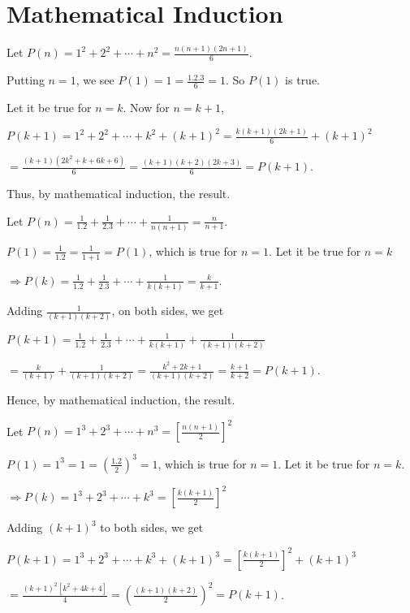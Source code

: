 \chapter{Mathematical Induction}
\startitemize[n, 1*broad]
\item Let $P(n) = 1^2 + 2^2 + \cdots + n^2 = \frac{n(n + 1)(2n + 1)}{6}$.

  Putting $n = 1$, we see $P(1) = 1 = \frac{1.2.3}{6} = 1$. So $P(1)$ is true.

  Let it be true for $n = k$. Now for $n = k + 1$,

  $P(k + 1) = 1^2 + 2^2 + \cdots + k^2 + (k + 1)^2 =  \frac{k(k + 1)(2k + 1)}{6} + (k + 1)^2$

  $= \frac{(k +
    1)(2k^2 + k + 6k + 6)}{6} = \frac{(k + 1)(k + 2)(2k + 3)}{6} = P(k + 1)$.

  Thus, by mathematical induction, the result.
\item Let $P(n) = \frac{1}{1.2} + \frac{1}{2.3} + \cdots + \frac{1}{n(n + 1)} = \frac{n}{n + 1}$.

  $P(1) = \frac{1}{1.2} = \frac{1}{1 + 1} = P(1)$, which is true for $n = 1$. Let it be true for $n = k$

  $\Rightarrow P(k) = \frac{1}{1.2} + \frac{1}{2.3} + \cdots + \frac{1}{k(k + 1)} = \frac{k}{k + 1}$.

  Adding $\frac{1}{(k + 1)(k + 2)}$, on both sides, we get

  $P(k + 1) = \frac{1}{1.2} + \frac{1}{2.3} + \cdots + \frac{1}{k(k + 1)} + \frac{1}{(k + 1)(k + 2)}$

  $= \frac{k}{(k + 1)} + \frac{1}{(k + 1)(k + 2)} = \frac{k^2 + 2k + 1}{(k + 1)(k + 2)} = \frac{k + 1}{k + 2} =
  P(k +1)$.

  Hence, by mathematical induction, the result.
\item Let $P(n) = 1^3 + 2^3 + \cdots + n^3 = \left[\frac{n(n + 1)}{2}\right]^2$

  $P(1) = 1^3 = 1 = \left(\frac{1.2}{2}\right)^3 = 1$, which is true for $n = 1$. Let it be true for $n =
  k$.

  $\Rightarrow P(k) = 1^3 + 2^3 + \cdots + k^3 = \left[\frac{k(k + 1)}{2}\right]^2$

  Adding $(k + 1)^3$ to both sides, we get

  $P(k + 1) = 1^3 + 2^3 + \cdots + k^3 + (k + 1)^3= \left[\frac{k(k + 1)}{2}\right]^2 + (k + 1)^3$

  $= \frac{(k
    + 1)^2[k^2 + 4k + 4]}{4} = \left(\frac{(k + 1)(k + 2)}{2}\right)^2 = P(k + 1)$.

